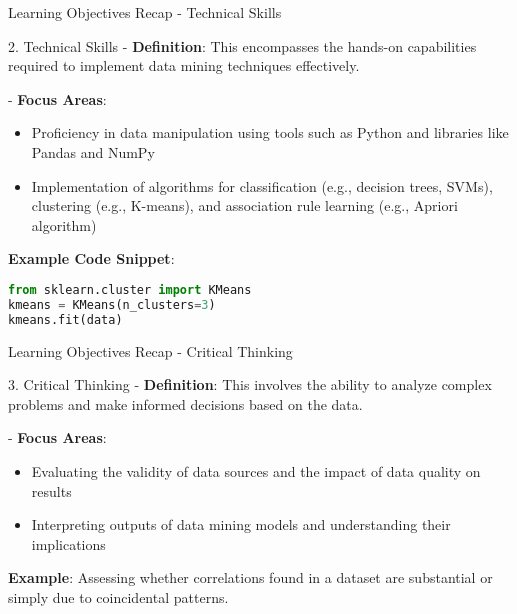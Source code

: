 \documentclass[aspectratio=169]{beamer}
\begin{document}
\begin{frame}[fragile]{Learning Objectives Recap - Technical Skills}
    \begin{block}{2. Technical Skills}
        - \textbf{Definition}: This encompasses the hands-on capabilities required to implement data mining techniques effectively.
        
        - \textbf{Focus Areas}:  
        \begin{itemize}
            \item Proficiency in data manipulation using tools such as Python and libraries like Pandas and NumPy
            \item Implementation of algorithms for classification (e.g., decision trees, SVMs), clustering (e.g., K-means), and association rule learning (e.g., Apriori algorithm)
        \end{itemize}
        
        \textbf{Example Code Snippet}:
        \begin{lstlisting}[language=Python]
from sklearn.cluster import KMeans
kmeans = KMeans(n_clusters=3)
kmeans.fit(data)
        \end{lstlisting}
    \end{block}
\end{frame}

\begin{frame}[fragile]{Learning Objectives Recap - Critical Thinking}
    \begin{block}{3. Critical Thinking}
        - \textbf{Definition}: This involves the ability to analyze complex problems and make informed decisions based on the data.
        
        - \textbf{Focus Areas}:  
        \begin{itemize}
            \item Evaluating the validity of data sources and the impact of data quality on results
            \item Interpreting outputs of data mining models and understanding their implications
        \end{itemize}

        \textbf{Example}: Assessing whether correlations found in a dataset are substantial or simply due to coincidental patterns.
    \end{block}
\end{frame}
\end{document}
